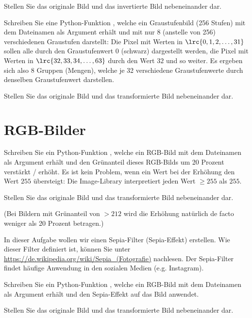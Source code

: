 \begin{questions}
	Stellen Sie das originale Bild und das invertierte Bild nebeneinander dar.


	Schreiben Sie eine Python-Funktion , welche ein Graustufenbild (256 Stufen) mit dem Dateinamen  als Argument erhält und mit nur 8 (anstelle von 256) verschiedenen Graustufen darstellt: Die Pixel mit Werten in $\lrc{0, 1, 2, \ldots, 31}$ sollen alle durch den Graustufenwert $0$ (schwarz) dargestellt werden, die Pixel mit Werten in $\lrc{32,33,34,\ldots, 63}$ durch den Wert $32$ und so weiter. Es ergeben sich also 8 Gruppen (Mengen), welche je 32 verschiedene Graustufenwerte durch denselben Graustufenwert darstellen.

	Stellen Sie das originale Bild und das transformierte Bild nebeneinander dar.



	\section*{RGB-Bilder}

	Schreiben Sie ein Python-Funktion , welche ein RGB-Bild mit dem Dateinamen  als Argument erhält und den Grünanteil dieses RGB-Bilds um 20 Prozent verstärkt / erhöht. Es ist kein Problem, wenn ein Wert bei der Erhöhung den Wert $255$ übersteigt: Die Image-Library interpretiert jeden Wert $\geq 255$ als $255$.

	Stellen Sie das originale Bild und das transformierte Bild nebeneinander dar.

	(Bei Bildern mit Grünanteil von $> 212$ wird die Erhöhung natürlich de facto weniger als 20 Prozent betragen.)



	In dieser Aufgabe wollen wir einen Sepia-Filter (Sepia-Effekt) erstellen. Wie dieser Filter definiert ist, können Sie unter \url{https://de.wikipedia.org/wiki/Sepia_(Fotografie)} nachlesen. Der Sepia-Filter findet häufige Anwendung in den sozialen Medien (e.g. Instagram).

	Schreiben Sie ein Python-Funktion , welche ein RGB-Bild mit dem Dateinamen  als Argument erhält und den Sepia-Effekt auf das Bild anwendet.

	Stellen Sie das originale Bild und das transformierte Bild nebeneinander dar.



\end{questions}
